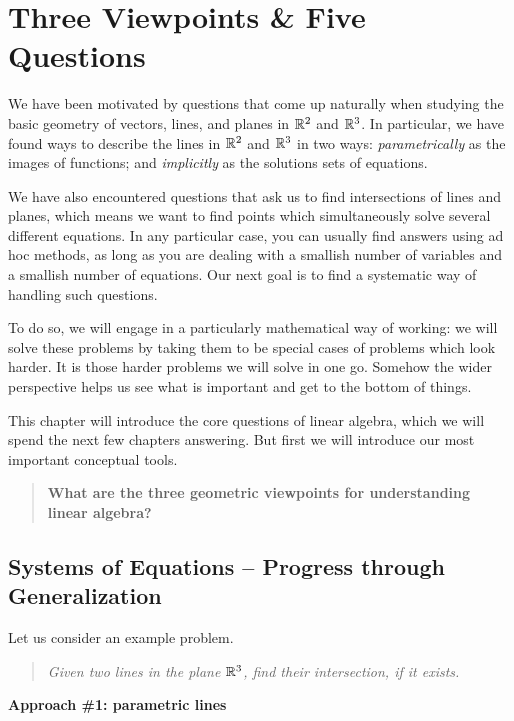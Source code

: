 \documentclass[00-livre-main.tex]{subfiles}
\begin{document}
\chapter{Three Viewpoints \& Five Questions}

We have been motivated by questions that come up naturally when studying the basic geometry of vectors, lines, and planes in $\mathbb{R}^2$ and $\mathbb{R}^3$. In particular, we have found ways to describe the lines in $\mathbb{R}^2$ and $\mathbb{R}^3$ in two ways: \emph{parametrically} as the images of functions; and \emph{implicitly} as the solutions sets of equations. 

We have also encountered questions that ask us to find intersections of lines and planes, which means we want to find points which simultaneously solve several different equations. In any particular case, you can usually find answers using ad hoc methods, as long as you are dealing with a smallish number of variables and a smallish number of equations. Our next goal is to find a systematic way of handling such questions. 

To do so, we will engage in a particularly mathematical way of working: we will solve these problems by taking them to be special cases of problems which look harder. It is those harder problems we will solve in one go. Somehow the wider perspective helps us see what is important and get to the bottom of things.

This chapter will introduce the core questions of linear algebra, which we will spend the next few chapters answering. But first we will introduce our most important conceptual tools.

\begin{quote}
\textbf{What are the three geometric viewpoints for understanding linear algebra?}
\end{quote}


\section{Systems of Equations -- Progress through Generalization}

Let us consider an example problem.

\begin{quote}
\textit{Given two lines in the plane $\mathbb{R}^3$, find their intersection, if it exists.}
\end{quote}

\noindent\textbf{Approach \#1: parametric lines}
\end{document}
